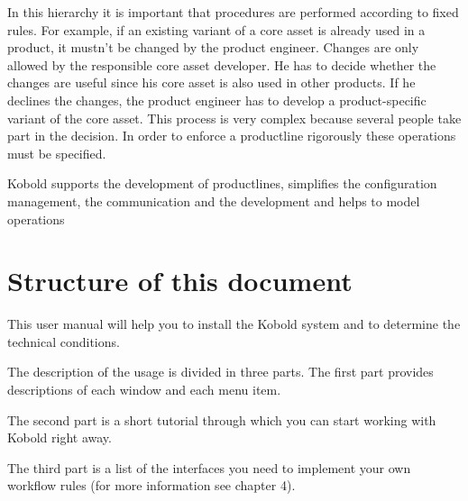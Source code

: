 In this hierarchy it is important that procedures are performed according to fixed
rules. For example, if an existing variant of a core asset is already used in
a product, it mustn't be changed by the product engineer. Changes are only
allowed by the responsible core asset developer. He has to decide whether the
changes are useful since his core asset is also used in other products. If he declines
the changes, the product engineer has to develop a product-specific variant of the
core asset. This process is very complex because several people take part in 
the decision. In order to enforce a productline rigorously these operations must
be specified. \par

Kobold supports the development of productlines, simplifies the configuration
management, the communication and the development and helps to model 
operations



\section{Structure of this document}
This user manual will help you to install the Kobold system and to
determine the technical conditions. \par
The description of the usage is divided in three parts. The first part provides descriptions of each window and
each menu item. 
\par
The second part is a short tutorial through which you can start working with Kobold right away.\par
The third part is a list of the interfaces you need to implement your own workflow
rules (for more information see chapter 4).